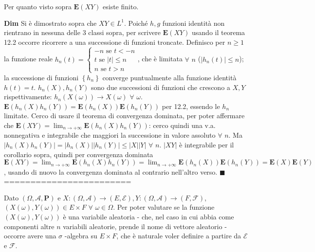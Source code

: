 \documentclass{article}
\begin{document}
Per quanto visto sopra $\mathbf{E}\left( XY\right) $ esiste finito.


\textbf{Dim} Si \`{e} dimostrato sopra che $XY\in L^{1}$. Poich\'{e} $h,g$
funzioni identit\`{a} non rientrano in nessuna delle 3 classi sopra, per
scrivere $\mathbf{E}\left( XY\right) $ usando il teorema 12.2 occorre
ricorrere a una successione di funzioni troncate. Definisco per $n\geq 1$ la
funzione reale $h_{n}\left( t\right) =\left\{ 
\begin{array}{c}
-n\text{ se }t<-n \\ 
t\text{ se }\left\vert t\right\vert \leq n \\ 
n\text{ se }t>n%
\end{array}%
\right. $, che \`{e} limitata $\forall $ $n$ ($\left\vert h_{n}\left(
t\right) \right\vert \leq n$); la successione di funzioni $\left\{
h_{n}\right\} $ converge puntualmente alla funzione identit\`{a} $h\left(
t\right) =t$. $h_{n}\left( X\right) ,h_{n}\left( Y\right) $ sono due
successioni di funzioni che crescono a $X,Y$ rispettivamente: $h_{n}\left(
X\left( \omega \right) \right) \rightarrow X\left( \omega \right) $ $\forall 
$ $\omega $. $\mathbf{E}\left( h_{n}\left( X\right) h_{n}\left( Y\right)
\right) =\mathbf{E}\left( h_{n}\left( X\right) \right) \mathbf{E}\left(
h_{n}\left( Y\right) \right) $ per 12.2, essendo le $h_{n}$ limitate. Cerco
di usare il teorema di convergenza dominata, per poter affermare che $%
\mathbf{E}\left( XY\right) =\lim_{n\rightarrow +\infty }\mathbf{E}\left(
h_{n}\left( X\right) h_{n}\left( Y\right) \right) $: cerco quindi una v.a.
nonnegativa e integrabile che maggiori la successione in valore assoluto $%
\forall $ $n$. Ma $\left\vert h_{n}\left( X\right) h_{n}\left( Y\right)
\right\vert =\left\vert h_{n}\left( X\right) \right\vert \left\vert
h_{n}\left( Y\right) \right\vert \leq \left\vert X\right\vert \left\vert
Y\right\vert $ $\forall $ $n$. $\left\vert XY\right\vert $ \`{e} integrabile
per il corollario sopra, quindi per convergenza dominata $\mathbf{E}\left(
XY\right) =\lim_{n\rightarrow +\infty }\mathbf{E}\left( h_{n}\left( X\right)
h_{n}\left( Y\right) \right) =\lim_{n\rightarrow +\infty }\mathbf{E}\left(
h_{n}\left( X\right) \right) \mathbf{E}\left( h_{n}\left( Y\right) \right) =%
\mathbf{E}\left( X\right) \mathbf{E}\left( Y\right) $, usando di nuovo la
convergenza dominata al contrario nell'altro verso. $\blacksquare $ \\
========================
\newpage

Dato $\left( \Omega ,\mathcal{A},\mathbf{P}\right) $ e $X:\left( \Omega ,%
\mathcal{A}\right) \rightarrow \left( E,\mathcal{E}\right) ,Y:\left( \Omega ,%
\mathcal{A}\right) \rightarrow \left( F,\mathcal{F}\right) $, $\left(
X\left( \omega \right) ,Y\left( \omega \right) \right) \in E\times F$ $%
\forall $ $\omega \in \Omega $. Per poter valutare se la funzione $\left(
X\left( \omega \right) ,Y\left( \omega \right) \right) $ \`{e} una variabile
aleatoria - che, nel caso in cui abbia come componenti altre $n$ variabili
aleatorie, prende il nome di vettore aleatorio - occorre avere una $\sigma $%
-algebra su $E\times F$, che \`{e} naturale voler definire a partire da $%
\mathcal{E}$ e $\mathcal{F}$.
\end{document}
